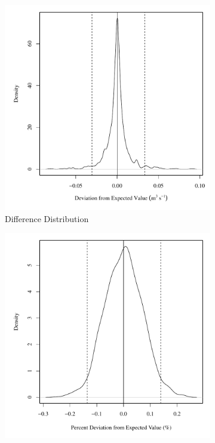 \begin{linenumbers}
\begin{figure}[htbp]
\centering
	\begin{subfigure}{0.5\textwidth}
		\centering
		\includegraphics[width=0.9\linewidth]{"Figures/Results_USR/V dev diff qin"}
		\caption{Difference Distribution}
		\label{sub:diff}
	\end{subfigure}%
	\begin{subfigure}{0.5\textwidth}
		\centering
		\includegraphics[width=0.9\linewidth]{"Figures/Results_USR/V dev pdiff qin"}

\end{subfigure}
\end{figure}
\end{linenumbers}
